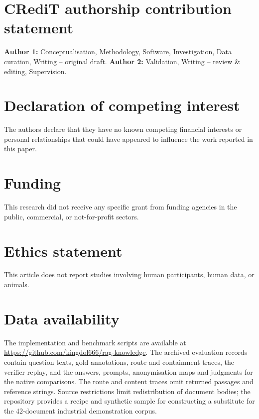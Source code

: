 
\section*{CRediT authorship contribution statement}
\textbf{Author 1:} Conceptualisation, Methodology, Software, Investigation,
Data curation, Writing -- original draft. \textbf{Author 2:} Validation,
Writing -- review \& editing, Supervision. %

\section*{Declaration of competing interest}
The authors declare that they have no known competing financial interests
or personal relationships that could have appeared to influence the work
reported in this paper.

\section*{Funding}
This research did not receive any specific grant from funding agencies in
the public, commercial, or not-for-profit sectors. %

\section*{Ethics statement}
This article does not report studies involving human participants, human
data, or animals.

\section*{Data availability}
The implementation and benchmark scripts are available at
\url{https://github.com/kingdol666/rag-knowledge}. The archived evaluation
records contain question texts, gold annotations, route and containment
traces, the verifier replay, and the answers, prompts, anonymisation maps
and judgments for the native comparisons. The route
and content traces omit returned passages and reference strings. Source
restrictions limit redistribution of document bodies; the repository
provides a recipe and synthetic sample for constructing a substitute for
the 42-document industrial demonstration corpus.

